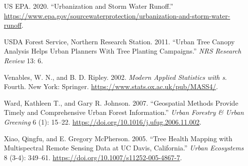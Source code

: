 \documentclass[12pt,twoside]{reedthesis}
\newlength{\cslhangindent}
\newenvironment{CSLReferences}[2] %
 {%
  \setlength{\parindent}{0pt}
  \ifodd #1 \everypar{\setlength{\hangindent}{\cslhangindent}}\ignorespaces\fi
  \ifnum #2 > 0
  \setlength{\parskip}{#2\baselineskip}
  \fi
 }%
 {}
\begin{document}
\begin{CSLReferences}{1}{0}
\leavevmode{}%
US EPA. 2020. {``Urbanization and Storm Water Runoff.''} \url{https://www.epa.gov/sourcewaterprotection/urbanization-and-storm-water-runoff}.

\leavevmode{}%
USDA Forest Service, Northern Research Station. 2011. {``Urban Tree Canopy Analysis Helps Urban Planners With Tree Planting Campaigns.''} \emph{NRS Research Review} 13: 6.

\leavevmode{}%
Venables, W. N., and B. D. Ripley. 2002. \emph{Modern Applied Statistics with s}. Fourth. New York: Springer. \url{https://www.stats.ox.ac.uk/pub/MASS4/}.

\leavevmode{}%
Ward, Kathleen T., and Gary R. Johnson. 2007. {``Geospatial Methods Provide Timely and Comprehensive Urban Forest Information.''} \emph{Urban Forestry \& Urban Greening} 6 (1): 15--22. \url{https://doi.org/10.1016/j.ufug.2006.11.002}.

\leavevmode{}%
Xiao, Qingfu, and E. Gregory McPherson. 2005. {``Tree Health Mapping with Multispectral Remote Sensing Data at UC Davis, California.''} \emph{Urban Ecosystems} 8 (3-4): 349--61. \url{https://doi.org/10.1007/s11252-005-4867-7}.

\end{CSLReferences}

\end{document}
